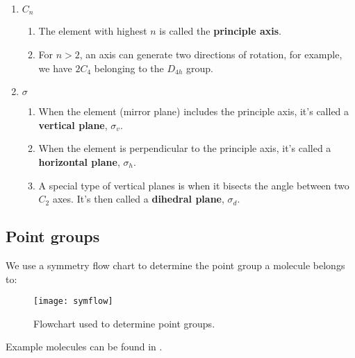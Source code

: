 \begin{enumerate}
	\item $C_n$
	\begin{enumerate}
	 	\item The element with highest $n$ is called the \textbf{principle axis}.
	 	\item For $n>2$, an axis can generate two directions of rotation, for example, we have $2C_4$ belonging to the $D_{4h}$ group. 
	 \end{enumerate}
	 \item $\sigma$
	 \begin{enumerate}
	 	\item When the element (mirror plane) includes the principle axis, it's called a \textbf{vertical plane}, $\sigma_v$.
	 	\item When the element is perpendicular to the principle axis, it's called a \textbf{horizontal plane}, $\sigma_h$.
	 	\item A special type of vertical planes is when it bisects the angle between two $C_2$ axes. It's then called a \textbf{dihedral plane}, $\sigma_d$.
	 \end{enumerate}
\end{enumerate}
\subsection{Point groups}
We use a symmetry flow chart to determine the point group a molecule belongs to:
\begin{figure}[ht]
	\texttt{[image: symflow]}
	\centering
	\caption{Flowchart used to determine point groups.}
	\label{fig:symflow}
\end{figure}
Example molecules can be found in \cite{wiki_pointgroup}. 
